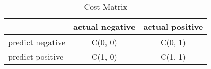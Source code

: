 \begin{table}[htbp]
\centering
\begin{tabular}{|l|c|c|}
\hline
                 & \multicolumn{1}{l|}{actual negative} & \multicolumn{1}{l|}{actual positive} \\ \hline
predict negative & C(0, 0)                              & C(0, 1)                              \\ \hline
predict positive & C(1, 0)                              & C(1, 1)                              \\ \hline
\end{tabular}
\caption{Cost Matrix}
\label{tab:costmatrix}
\end{table}
